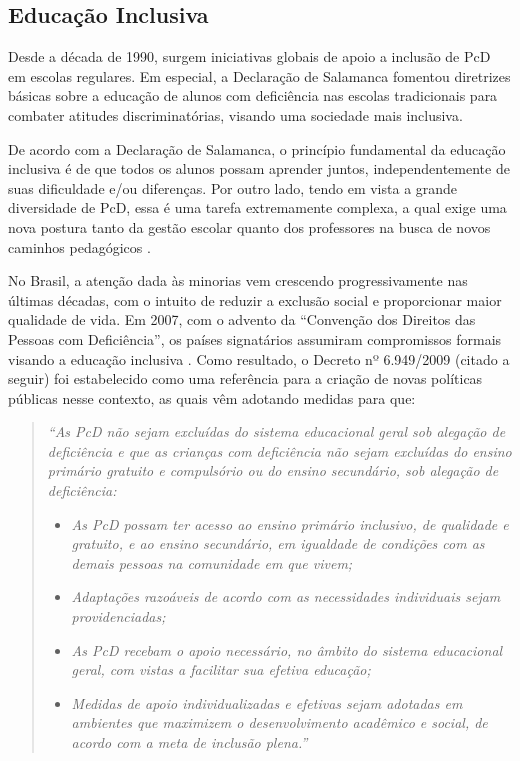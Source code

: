 \subsection{Educação Inclusiva}
\label{fundamentacao-teorica:linguas-sinais:educacao-inclusiva}

Desde a década de 1990, surgem iniciativas globais de apoio a inclusão de PcD em escolas regulares. Em especial, a Declaração de Salamanca \cite{UNESCO1994} fomentou diretrizes básicas sobre a educação de alunos com deficiência nas escolas tradicionais para combater atitudes discriminatórias, visando uma sociedade mais inclusiva.

De acordo com a Declaração de Salamanca, o princípio fundamental da educação inclusiva é de que todos os alunos possam aprender juntos, independentemente de suas dificuldade e/ou diferenças. Por outro lado, tendo em vista a grande diversidade de PcD, essa é uma tarefa extremamente complexa, a qual exige uma nova postura tanto da gestão escolar quanto dos professores na busca de novos caminhos pedagógicos \cite{David2015}.

No Brasil, a atenção dada às minorias vem crescendo progressivamente nas últimas décadas, com o intuito de reduzir a exclusão social e proporcionar maior qualidade de vida. Em 2007, com o advento da ``Convenção dos Direitos das Pessoas com Deficiência'', os países signatários assumiram compromissos formais visando a educação inclusiva \cite{David2015,Quadros2019}. Como resultado, o Decreto nº 6.949/2009 (citado a seguir) foi estabelecido como uma referência para a criação de novas políticas públicas nesse contexto, as quais vêm adotando medidas para que:

\begin{quote}
\textit{``As PcD não sejam excluídas do sistema educacional geral sob alegação de deficiência e que as crianças com deficiência não sejam excluídas do ensino primário gratuito e compulsório ou do ensino secundário, sob alegação de deficiência:}
\begin{itemize}
    \item \textit{As PcD possam ter acesso ao ensino primário inclusivo, de qualidade e gratuito, e ao ensino secundário, em igualdade de condições com as demais pessoas na comunidade em que vivem;}
    \item \textit{Adaptações razoáveis de acordo com as necessidades individuais sejam providenciadas;}
    \item \textit{As PcD recebam o apoio necessário, no âmbito do sistema educacional geral, com vistas a facilitar sua efetiva educação;}
    \item \textit{Medidas de apoio individualizadas e efetivas sejam adotadas em ambientes que maximizem o desenvolvimento acadêmico e social, de acordo com a meta de inclusão plena.''}
\end{itemize}
\end{quote}

